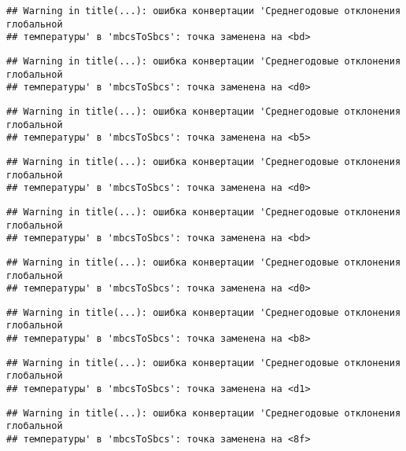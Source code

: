 \documentclass[
]{article}
\begin{document}
\begin{verbatim}
## Warning in title(...): ошибка конвертации 'Среднегодовые отклонения глобальной
## температуры' в 'mbcsToSbcs': точка заменена на <bd>
\end{verbatim}

\begin{verbatim}
## Warning in title(...): ошибка конвертации 'Среднегодовые отклонения глобальной
## температуры' в 'mbcsToSbcs': точка заменена на <d0>
\end{verbatim}

\begin{verbatim}
## Warning in title(...): ошибка конвертации 'Среднегодовые отклонения глобальной
## температуры' в 'mbcsToSbcs': точка заменена на <b5>
\end{verbatim}

\begin{verbatim}
## Warning in title(...): ошибка конвертации 'Среднегодовые отклонения глобальной
## температуры' в 'mbcsToSbcs': точка заменена на <d0>
\end{verbatim}

\begin{verbatim}
## Warning in title(...): ошибка конвертации 'Среднегодовые отклонения глобальной
## температуры' в 'mbcsToSbcs': точка заменена на <bd>
\end{verbatim}

\begin{verbatim}
## Warning in title(...): ошибка конвертации 'Среднегодовые отклонения глобальной
## температуры' в 'mbcsToSbcs': точка заменена на <d0>
\end{verbatim}

\begin{verbatim}
## Warning in title(...): ошибка конвертации 'Среднегодовые отклонения глобальной
## температуры' в 'mbcsToSbcs': точка заменена на <b8>
\end{verbatim}

\begin{verbatim}
## Warning in title(...): ошибка конвертации 'Среднегодовые отклонения глобальной
## температуры' в 'mbcsToSbcs': точка заменена на <d1>
\end{verbatim}

\begin{verbatim}
## Warning in title(...): ошибка конвертации 'Среднегодовые отклонения глобальной
## температуры' в 'mbcsToSbcs': точка заменена на <8f>
\end{verbatim}
\end{document}
